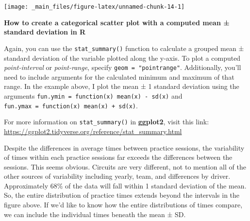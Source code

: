 \documentclass[
]{book}
\begin{document}
\begin{center}\texttt{[image: \_main\_files/figure-latex/unnamed-chunk-14-1]} \end{center}

\begin{blackbox}

\begin{center}
\textbf{How to create a categorical scatter plot with a computed mean ± standard deviation in R}

\end{center}

Again, you can use the \texttt{stat\_summary()} function to calculate a grouped mean ± standard deviation of the variable plotted along the y-axis. To plot a computed \emph{point-interval} or \emph{point-range}, specify \texttt{geom\ =\ "pointrange"}. Additionally, you'll need to include arguments for the calculated minimum and maximum of that range. In the example above, I plot the mean ± 1 standard deviation using the arguments \texttt{fun.ymin\ =\ function(x)\ mean(x)\ -\ sd(x)} and \texttt{fun.ymax\ =\ function(x)\ mean(x)\ +\ sd(x)}.

For more information on \texttt{stat\_summary()} in \textbf{ggplot2}, visit this link: \url{https://ggplot2.tidyverse.org/reference/stat_summary.html}

\end{blackbox}

Despite the differences in average times between practice sessions, the variability of times within each practice sessions far exceeds the differences between the sessions. This seems obvious. Circuits are very different, not to mention all of the other sources of variability including yearly, team, and differences by driver. Approximately 68\% of the data will fall within 1 standard deviation of the mean. So, the entire distribution of practice times extends beyond the intervals in the figure above. If we'd like to know how the entire distributions of times compare, we can include the individual times beneath the mean ± SD.
\end{document}
